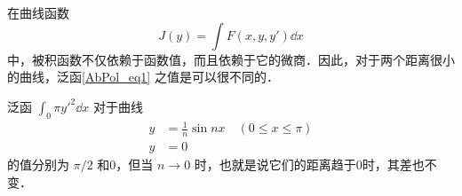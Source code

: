 在曲线函数
\begin{equation}\label{AbPol_eq1}
J(y)=\int F(x,y,y')\dd x
\end{equation}
中，被积函数不仅依赖于函数值，而且依赖于它的微商．因此，对于两个距离很小的曲线，泛函\autoref{AbPol_eq1} 之值是可以很不同的．
\begin{example}{}
泛函 $\int_0\pi y'^2\dd x$ 对于曲线
\begin{equation}
\begin{aligned}
y&=\frac{1}{n}\sin nx\quad (0\leq x\leq \pi)\\
y&=0
\end{aligned}
\end{equation}
的值分别为 $\pi/2$ 和0，但当 $n\rightarrow 0$ 时，也就是说它们的距离趋于0时，其差也不变．
\end{example}


